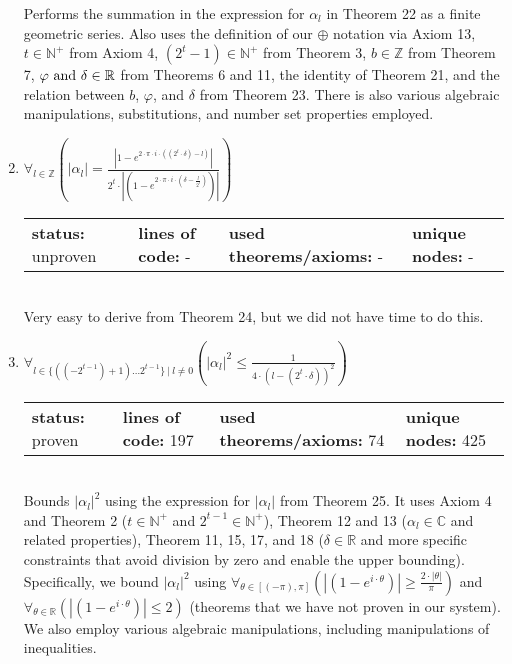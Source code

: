 \documentclass{article}[12pt]
\begin{document}
\begin{enumerate}
  Performs the summation in the expression for $\alpha_l$ in Theorem 22 as a finite geometric series.  Also uses the definition of our $\oplus$ notation via Axiom 13, $t \in \mathbb{N}^+$ from Axiom 4, $(2^t - 1) \in \mathbb{N}^+$ from Theorem 3, $b \in \mathbb{Z}$ from Theorem 7, $\varphi~{\rm and}~\delta \in \mathbb{R}$ from Theorems 6 and 11, the identity of Theorem 21, and the relation between $b$, $\varphi$, and $\delta$ from Theorem 23.  There is also various algebraic manipulations, substitutions, and number set properties employed.
\item $\forall_{l \in \mathbb{Z}} \left(\left|\alpha_{l}\right| = \frac{\left|1 - e^{2 \cdot \pi \cdot i \cdot \left(\left(2^{t} \cdot \delta\right) - l\right)}\right|}{2^{t} \cdot \left|\left(1 - e^{2 \cdot \pi \cdot i \cdot \left(\delta - \frac{l}{2^{t}}\right)}\right)\right|}\right)$ \hfill \\
  \begin{tabular}{l | l | l | l}
    \textbf{status:} unproven & \textbf{lines of code:} - & \textbf{used theorems/axioms:} - & \textbf{unique nodes:} -        
  \end{tabular} \hfill \\
Very easy to derive from Theorem 24, but we did not have time to do this.
\item $\forall_{l \in \{\left(\left(-2^{t - 1}\right) + 1\right)\ldots 2^{t - 1}\}~|~l \neq 0} \left(\left|\alpha_{l}\right|^{2} \leq \frac{1}{4 \cdot \left(l - \left(2^{t} \cdot \delta\right)\right)^{2}}\right)$ \hfill \\
  \begin{tabular}{l | l | l | l}
    \textbf{status:} proven & \textbf{lines of code:} 197 & \textbf{used theorems/axioms:} 74 & \textbf{unique nodes:} 425
  \end{tabular} \hfill \\
  Bounds $\lvert \alpha_l \rvert^2$ using the expression for $\lvert \alpha_l \rvert$ from Theorem 25.  It uses Axiom 4 and Theorem 2 ($t \in \mathbb{N}^+$ and $2^{t-1} \in \mathbb{N}^+$), Theorem 12 and 13 ($\alpha_l \in \mathbb{C}$ and related properties), Theorem 11, 15, 17, and 18 ($\delta \in \mathbb{R}$ and more specific constraints that avoid division by zero and enable the upper bounding).  Specifically, we bound $\lvert \alpha_l \rvert^2$ using $\forall_{\theta \in \left[\left(-\pi\right),\pi\right]} \left(\left|\left(1 - e^{i \cdot \theta}\right)\right| \geq \frac{2 \cdot \left|\theta\right|}{\pi}\right)$ and $\forall_{\theta \in \mathbb{R}} \left(\left|\left(1 - e^{i \cdot \theta}\right)\right| \leq 2\right)$ (theorems that we have not proven in our system).  We also employ various algebraic manipulations, including manipulations of inequalities.

\end{enumerate}
\end{document}

